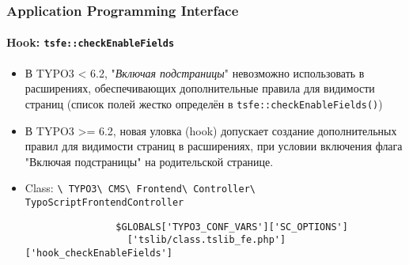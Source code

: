\begin{frame}[fragile]
	\frametitle{Application Programming Interface}
	\framesubtitle{Hook: \texttt{tsfe::checkEnableFields}}

	\begin{itemize}
		\item В TYPO3 < 6.2, "\emph{Включая подстраницы}" невозможно использовать в расширениях, обеспечивающих дополнительные правила для видимости страниц\newline
			\small(список полей жестко определён в \texttt{tsfe::checkEnableFields()})\normalsize

		\item В TYPO3 >= 6.2, новая уловка (hook) допускает создание дополнительных правил для видимости страниц в расширениях, при условии включения флага "Включая подстраницы" на родительской странице.
		\item Class:\newline
			\smaller
				\texttt{\textbackslash
					TYPO3\textbackslash
					CMS\textbackslash
					Frontend\textbackslash
					Controller\textbackslash
					TypoScriptFrontendController}\normalsize

			\lstset{
				basicstyle=\smaller\ttfamily
			}

			\begin{lstlisting}
				$GLOBALS['TYPO3_CONF_VARS']['SC_OPTIONS']
				  ['tslib/class.tslib_fe.php']['hook_checkEnableFields']
			\end{lstlisting}

	\end{itemize}

\end{frame}


